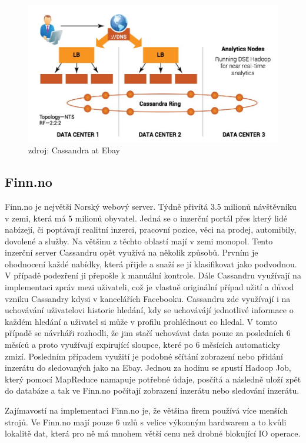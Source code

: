 \begin{figure}[h]
\centering
\includegraphics[scale=0.4]{images/ebay}
\caption{zdroj:  Cassandra at Ebay \cite{ebay}}
\label{fig:timeseries1}
\end{figure}

\subsection{Finn.no}
Finn.no je největší Norský webový server. Týdně přivítá 3.5 milionů návštěvníku v zemi, která má 5 milionů obyvatel. Jedná se o inzerční portál přes který lidé nabízejí, či poptávají realitní inzerci, pracovní pozice, věci na prodej, automibily, dovolené a služby. Na většinu z těchto oblastí mají v zemi monopol. Tento inzerční server Cassandru opět využívá na několik způsobů. Prvním je ohodnocení každé nabídky, která přijde a snaží se jí klasifikovat jako podvodnou. V případě podezření ji přepošle k manuální kontrole. Dále Cassandru využívají na implementaci zpráv mezi uživateli, což je vlastně originální případ užití a důvod vzniku Cassandry kdysi v kancelářích Facebooku. Cassandru zde využívají i na uchovávání uživatelovi historie hledání, kdy se uchovávájí jednotlivé informace o každém hledání a uživatel si může v profilu prohlédnout co hledal. V tomto případě se návrháři rozhodli, že jim stačí uchovávat data pouze za posledních 6 měsíců a proto využívají expirující sloupce, které po 6 měsících automaticky zmizí. Posledním případem využití je podobné sčítání zobrazení nebo přidání inzerátu do sledovaných jako na Ebay. Jednou za hodinu se spustí Hadoop Job, který pomocí MapReduce namapuje potřebné údaje, posčítá a následně uloží zpět do databáze a tak ve Finn.no počítají zobrazení inzerátu nebo sledování inzerátu. 

Zajímavostí na implementaci Finn.no je, že většina firem používá více menších strojů. Ve Finn.no mají pouze 6 uzlů s velice výkonným hardwarem a to kvůli lokalitě dat, která pro ně má mnohem větší cenu než drobné blokující IO operace. 

